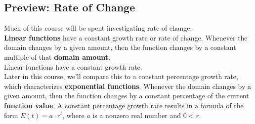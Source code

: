 \documentclass{ximera}
\begin{document}
\subsection{Preview: Rate of Change}
Much of this course will be spent investigating rate of change. \\

\textbf{Linear functions} have a constant growth rate or rate of change.  Whenever the domain changes by a given amount, then the function changes by a constant multiple of that \textbf{\textcolor{purple!85!blue}{domain amount}}. \\

Linear functions have a constant growth rate.    \\

Later in this course, we'll compare this to a constant percentage growth rate, which characterizes \textbf{exponential functions}. Whenever the domain changes by a given amount, then the function changes by a constant percentage of the current \textbf{\textcolor{blue!55!black}{function value}}.  A constant percentage growth rate results in a formula of the form $E(t) = a \cdot r^t$, where $a$ is a nonzero real number and $0 < r$. \\
\end{document}

